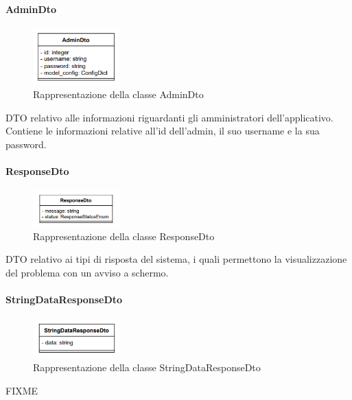 \paragraph{AdminDto} \label{AdminDto}
\begin{figure}[h!]
    \centering
    \includegraphics[width=0.30\textwidth]{assets/Backend/admin_dto.png}
    \caption{Rappresentazione della classe AdminDto}
  \end{figure}
\par DTO relativo alle informazioni riguardanti gli amministratori dell'applicativo. Contiene le informazioni relative all'id dell'admin, il suo username e la sua password.

\paragraph{ResponseDto} \label{ResponseDto}
\begin{figure}[h!]
    \centering
    \includegraphics[width=0.30\textwidth]{assets/Backend/response_dto.png}
    \caption{Rappresentazione della classe ResponseDto}
  \end{figure}
\par DTO relativo ai tipi di risposta del sistema, i quali permettono la visualizzazione del problema con un avviso a schermo.

\paragraph{StringDataResponseDto} \label{StringDataResponseDto}
\begin{figure}[h!]
    \centering
    \includegraphics[width=0.30\textwidth]{assets/Backend/string_data_response_dto.png}
    \caption{Rappresentazione della classe StringDataResponseDto}
  \end{figure}
\par FIXME


